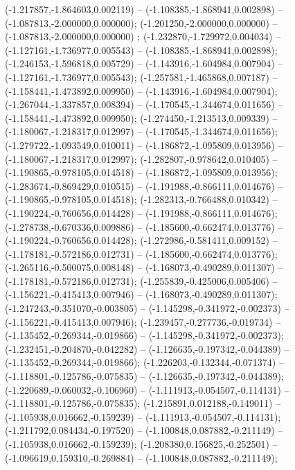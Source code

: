  (-1.217857,-1.864603,0.002119) -- (-1.108385,-1.868941,0.002898) -- (-1.087813,-2.000000,0.000000);
 (-1.201250,-2.000000,0.000000) -- (-1.087813,-2.000000,0.000000) ;
 (-1.232870,-1.729972,0.004034) -- (-1.127161,-1.736977,0.005543) -- (-1.108385,-1.868941,0.002898);
 (-1.246153,-1.596818,0.005729) -- (-1.143916,-1.604984,0.007904) -- (-1.127161,-1.736977,0.005543);
 (-1.257581,-1.465868,0.007187) -- (-1.158441,-1.473892,0.009950) -- (-1.143916,-1.604984,0.007904);
 (-1.267044,-1.337857,0.008394) -- (-1.170545,-1.344674,0.011656) -- (-1.158441,-1.473892,0.009950);
 (-1.274450,-1.213513,0.009339) -- (-1.180067,-1.218317,0.012997) -- (-1.170545,-1.344674,0.011656);
 (-1.279722,-1.093549,0.010011) -- (-1.186872,-1.095809,0.013956) -- (-1.180067,-1.218317,0.012997);
 (-1.282807,-0.978642,0.010405) -- (-1.190865,-0.978105,0.014518) -- (-1.186872,-1.095809,0.013956);
 (-1.283674,-0.869429,0.010515) -- (-1.191988,-0.866111,0.014676) -- (-1.190865,-0.978105,0.014518);
 (-1.282313,-0.766488,0.010342) -- (-1.190224,-0.760656,0.014428) -- (-1.191988,-0.866111,0.014676);
 (-1.278738,-0.670336,0.009886) -- (-1.185600,-0.662474,0.013776) -- (-1.190224,-0.760656,0.014428);
 (-1.272986,-0.581411,0.009152) -- (-1.178181,-0.572186,0.012731) -- (-1.185600,-0.662474,0.013776);
 (-1.265116,-0.500075,0.008148) -- (-1.168073,-0.490289,0.011307) -- (-1.178181,-0.572186,0.012731);
 (-1.255839,-0.425006,0.005406) -- (-1.156221,-0.415413,0.007946) -- (-1.168073,-0.490289,0.011307);
 (-1.247243,-0.351070,-0.003805) -- (-1.145298,-0.341972,-0.002373) -- (-1.156221,-0.415413,0.007946);
 (-1.239457,-0.277736,-0.019734) -- (-1.135452,-0.269344,-0.019866) -- (-1.145298,-0.341972,-0.002373);
 (-1.232451,-0.204870,-0.042282) -- (-1.126635,-0.197342,-0.044389) -- (-1.135452,-0.269344,-0.019866);
 (-1.226203,-0.132344,-0.071374) -- (-1.118801,-0.125786,-0.075835) -- (-1.126635,-0.197342,-0.044389);
 (-1.220689,-0.060032,-0.106960) -- (-1.111913,-0.054507,-0.114131) -- (-1.118801,-0.125786,-0.075835);
 (-1.215891,0.012188,-0.149011) -- (-1.105938,0.016662,-0.159239) -- (-1.111913,-0.054507,-0.114131);
 (-1.211792,0.084434,-0.197520) -- (-1.100848,0.087882,-0.211149) -- (-1.105938,0.016662,-0.159239);
 (-1.208380,0.156825,-0.252501) -- (-1.096619,0.159310,-0.269884) -- (-1.100848,0.087882,-0.211149);

